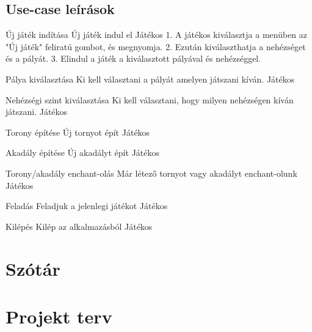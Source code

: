 \subsection{Use-case leírások}


\usecase
{Új játék indítása}
{Új játék indul el}
{Játékos}
{1. A játékos kiválasztja a menüben az "Új játék" feliratú gombot, és megnyomja.
2. Ezután kiválaszthatja  a nehézséget és a pályát. 
3. Elindul a játék a kiválasztott pályával és nehézséggel.}

\usecase
{Pálya kiválasztása}
{Ki kell választani a pályát amelyen játszani kíván.}
{Játékos}
{}

\usecase
{Nehézségi szint kiválasztása}
{Ki kell választani, hogy milyen nehézségen kíván játszani.}
{Játékos}
{}

\usecase
{Torony építése}
{Új tornyot épít}
{Játékos}
{}

\usecase
{Akadály építése}
{Új akadályt épít}
{Játékos}
{}

\usecase
{Torony/akadály enchant-olás}
{Már létező tornyot vagy akadályt enchant-olunk}
{Játékos}
{}

\usecase
{Feladás}
{Feladjuk a jelenlegi játékot}
{Játékos}
{}

\usecase
{Kilépés}
{Kilép az alkalmazásból}
{Játékos}
{}

\section{Szótár}

\section{Projekt terv}


